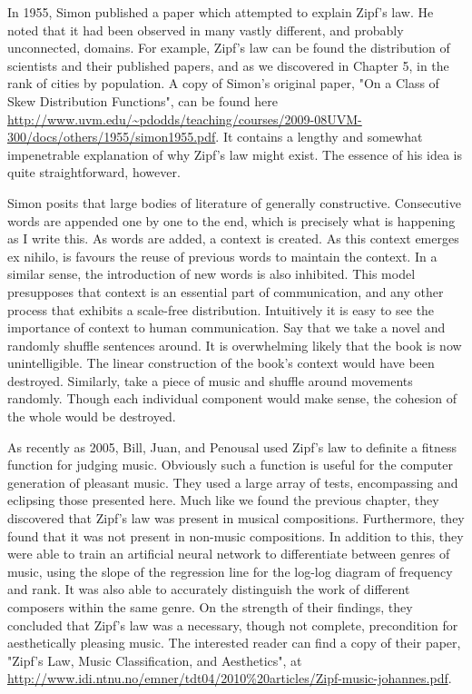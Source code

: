 \documentclass[10pt]{book}
\begin{document}
In 1955, Simon published a paper which attempted to explain Zipf's law. He noted that it had been observed in many vastly different, and probably unconnected, domains. For example, Zipf's law can be found the distribution of scientists and their published papers, and as we discovered in Chapter 5, in the rank of cities by population. A copy of Simon's original paper, "On a Class of Skew Distribution Functions", can be found here \url{http://www.uvm.edu/~pdodds/teaching/courses/2009-08UVM-300/docs/others/1955/simon1955.pdf}. It contains a lengthy and somewhat impenetrable explanation of why Zipf's law might exist. The essence of his idea is quite straightforward, however.

Simon posits that large bodies of literature of generally constructive. Consecutive words are appended one by one to the end, which is precisely what is happening as I write this. As words are added, a context is created. As this context emerges ex nihilo, is favours the reuse of previous words to maintain the context. In a similar sense, the introduction of new words is also inhibited. This model presupposes that context is an essential part of communication, and any other process that exhibits a scale-free distribution. Intuitively it is easy to see the importance of context to human communication. Say that we take a novel and randomly shuffle sentences around. It is overwhelming likely that the book is now unintelligible. The linear construction of the book's context would have been destroyed. Similarly, take a piece of music and shuffle around movements randomly. Though each individual component would make sense, the cohesion of the whole would be destroyed.

As recently as 2005, Bill, Juan, and Penousal used Zipf's law to definite a fitness function for judging music. Obviously such a function is useful for the computer generation of pleasant music. They used a large array of tests, encompassing and eclipsing those presented here. Much like we found the previous chapter, they discovered that Zipf's law was present in musical compositions. Furthermore, they found that it was not present in non-music compositions. In addition to this, they were able to train an artificial neural network to differentiate between genres of music, using the slope of the regression line for the log-log diagram of frequency and rank. It was also able to accurately distinguish the work of different composers within the same genre. On the strength of their findings, they concluded that Zipf's law was a necessary, though not complete, precondition for aesthetically pleasing music. The interested reader can find a copy of their paper, "Zipf's Law, Music Classification, and Aesthetics", at \url{http://www.idi.ntnu.no/emner/tdt04/2010\%20articles/Zipf-music-johannes.pdf}.
\end{document}
